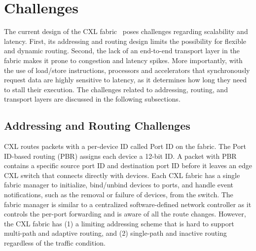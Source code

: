 
\section{Challenges}
%
The current design of the CXL fabric~\cite{cxl-3-0-spec} poses challenges regarding scalability and latency.
%
First, its addressing and routing design limits the possibility for flexible and dynamic routing.
%
Second, the lack of an end-to-end transport layer in the fabric makes it prone to congestion and latency spikes.
%
More importantly, with the use of load/store instructions, processors and accelerators that synchronously request data are highly sensitive to latency, as it determines how long they need to stall their execution.
%
The challenges related to addressing, routing, and transport layers are discussed in the following subsections.

\subsection{Addressing and Routing Challenges}
\label{aurelia:sec:motivation:routing}

CXL routes packets with a per-device ID called Port ID on the fabric. 
%
The Port ID-based routing (PBR) assigns each device a 12-bit ID.
%
A packet with PBR contains a specific source port ID and destination port ID before it leaves an edge CXL switch that connects directly with devices.
%
Each CXL fabric has a single fabric manager to initialize, bind/unbind devices to ports, and handle event notifications, such as the removal or failure of devices, from the switch.   
%
The fabric manager is similar to a centralized software-defined network controller as it controls the per-port forwarding and is aware of all the route changes. 
%
However, the CXL fabric has (1) a limiting addressing scheme that is hard to support multi-path and adaptive routing, and 
(2) single-path and inactive routing regardless of the traffic condition.

